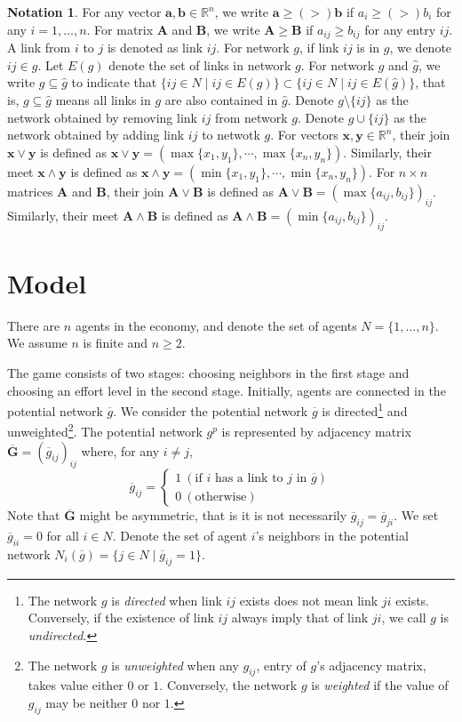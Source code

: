 \documentclass[12pt]{article}
\theoremstyle{definition}
\newtheorem*{notation*}{Notation}
\newcommand{\bm}[1]{\boldsymbol{#1}}
\begin{document}
\begin{notation*}
For any vector $\bm{a}, \bm{b} \in \mathbb{R}^n$, we write $\bm{a} \ge(>) \bm{b}$ if $a_i \ge(>) b_i$ for any $i=1, \ldots, n$.
For matrix $\bm{A}$ and $\bm{B}$, we write $\bm{A} \ge \bm{B}$ if $a_{ij} \ge b_{ij}$ for any entry $ij$.
A link from $i$ to $j$ is denoted as link $ij$.
For network $g$, if link $ij$ is in $g$, we denote $ij \in g$.
Let $E(g)$ denote the set of links in network $g$.
For network $g$ and $\hat{g}$, we write $g \subseteq \hat{g}$ to indicate that $\{ij \in N \mid ij \in E(g)\} \subset \{ij \in N \mid ij \in E(\hat{g})\}$, that is, $g \subseteq \hat{g}$ means all links in $g$ are also contained in $\hat{g}$.
Denote $g \setminus \{ ij \}$ as the network obtained by removing link $ij$ from network $g$.
Denote $g \cup \{ ij \}$ as the network obtained by adding link $ij$ to netwotk $g$.
For vectors $\bm{x}, \bm{y} \in \mathbb{R}^n$, their join $\bm{x} \vee \bm{y}$ is defined as $\bm{x} \vee \bm{y} = (\max\{x_1, y_1\}, \cdots, \max\{x_n, y_n\})$.
Similarly, their meet $\bm{x} \wedge \bm{y}$ is defined as $\bm{x} \wedge \bm{y} = (\min\{x_1, y_1\}, \cdots, \min\{x_n, y_n\})$.
For $n \times n$ matrices $\bm{A}$ and $\bm{B}$, their join $\bm{A} \vee \bm{B}$ is defined as $\bm{A} \vee \bm{B} = {(\max\{a_{ij}, b_{ij}\})}_{ij}$.
Similarly, their meet $\bm{A} \wedge \bm{B}$ is defined as $\bm{A} \wedge \bm{B} = {(\min\{a_{ij}, b_{ij}\})}_{ij}$.
\end{notation*}

\section{Model}

There are $n$ agents in the economy, and denote the set of agents $N = \{ 1, \ldots, n\}$.
We assume $n$ is finite and $n \ge 2$.

The game consists of two stages: choosing neighbors in the first stage and choosing an effort level in the second stage.
Initially, agents are connected in the potential network $\overline{g}$.
We consider the potential network $\overline{g}$ is directed\footnote{The network $g$ is {\it{directed}} when link $ij$ exists does not mean link $ji$ exists. Conversely, if the existence of link $ij$ always imply that of link $ji$, we call $g$ is {\it{undirected}}.} and unweighted\footnote{The network $g$ is {\it{unweighted}} when any $g_{ij}$, entry of $g$'s adjacency matrix, takes value either $0$ or $1$. Conversely, the network $g$ is {\it{weighted}} if the value of $g_{ij}$ may be neither $0$ nor $1$.}.
The potential network $g^p$ is represented by adjacency matrix $\bm{\overline{G}} = {(\overline{g}_{ij})}_{ij}$ where, for any $i \neq j$,
\[ \overline{g}_{ij} =
	\begin{cases}
		1 \  (\text{if $i$ has a link to $j$ in $\overline{g}$}) \\
		0 \  (\text{otherwise})
	\end{cases} \]
Note that $\bm{\overline{G}}$ might be asymmetric, that is it is not necessarily $\overline{g}_{ij} = \overline{g}_{ji}$.
We set $\overline{g}_{ii} = 0$ for all $i \in N$.
Denote the set of agent $i$'s neighbors in the potential network $N_i(\overline{g}) = \{ j \in N \mid \overline{g}_{ij} = 1 \}$.
\end{document}
